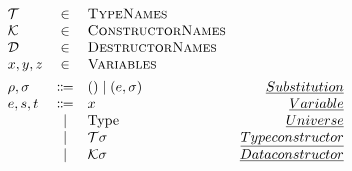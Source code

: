 \[
\begin{array}{lclr}
    \mathcal{T} &\in &\textsc{TypeNames} & \\
    \mathcal{K} &\in &\textsc{ConstructorNames} & \\
    \mathcal{D} &\in &\textsc{DestructorNames} & \\
    x,y,z &\in &\textsc{Variables} & \\[0.15cm]
    \rho, \sigma &\Coloneqq & () \mid (e,\sigma) & \emph{Substitution} \\
    e,s,t &\Coloneqq & x & \emph{Variable} \\
    & \mid & \text{Type} & \emph{Universe} \\
    & \mid & \mathcal{T}\sigma & \emph{Type constructor} \\
    & \mid & \mathcal{K}\sigma & \emph{Data constructor} \\
\end{array}
\]